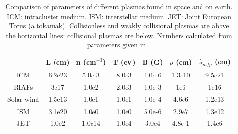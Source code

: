 \begin{table}[h]
  \begin{tabular}{c|c|c|c|c|c|c}  
    & L (cm) & n (cm$^{-3}$) & T (eV) & B (G) & $\rho$ (cm) & $\lambda_{mfp}$ (cm) \\ \hline\hline
    ICM & 6.2e23 & 5.0e-3 & 8.0e3 & 1.0e-6 & 1.3e10 & 9.5e21 \\ 
    RIAFs & 3e17 & 1.0e2 & 2.0e3 & 1.0e-3 & 1e6 & 1e16  \\ 
    Solar wind & 1.5e13 & 1.0e1 & 1.0e1 & 1.0e-4 & 4.6e6 & 1.2e13  \\ \hline
    ISM & 3.1e20 & 1.0e0 & 1.0e0 & 5.0e-6 & 2.9e7 & 1.3e12  \\ 
    JET & 1.0e2 & 1.0e14 & 1.0e4 & 3.0e4 & 4.8e-1 & 1.4e6  \\ 
  \end{tabular}
  \caption{Comparison of parameters of different plasmas found in space and on earth. ICM: intracluster medium. ISM: interstellar medium. JET: Joint European Torus (a tokamak). Collisionless and weakly collisional plasmas are above the horizontal lines; collisional plasmas are below. Numbers calculated from parameters given in~\cite{Kunz2010,AST521Pset1}.}
  \label{table:paramCompare}
\end{table}




